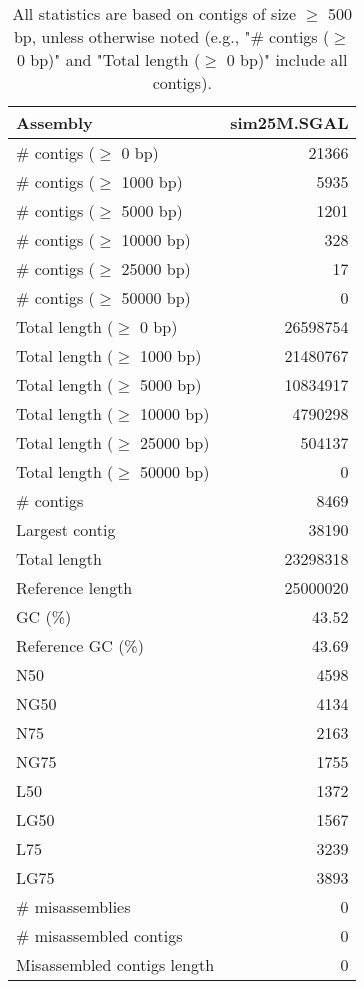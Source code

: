 \documentclass[12pt,a4paper]{article}
\begin{document}
\begin{table}[ht]
\begin{center}
\caption{All statistics are based on contigs of size $\geq$ 500 bp, unless otherwise noted (e.g., "\# contigs ($\geq$ 0 bp)" and "Total length ($\geq$ 0 bp)" include all contigs).}
\begin{tabular}{|l*{1}{|r}|}
\hline
Assembly & sim25M.SGAL \\ \hline
\# contigs ($\geq$ 0 bp) & 21366 \\ \hline
\# contigs ($\geq$ 1000 bp) & 5935 \\ \hline
\# contigs ($\geq$ 5000 bp) & 1201 \\ \hline
\# contigs ($\geq$ 10000 bp) & 328 \\ \hline
\# contigs ($\geq$ 25000 bp) & 17 \\ \hline
\# contigs ($\geq$ 50000 bp) & 0 \\ \hline
Total length ($\geq$ 0 bp) & 26598754 \\ \hline
Total length ($\geq$ 1000 bp) & 21480767 \\ \hline
Total length ($\geq$ 5000 bp) & 10834917 \\ \hline
Total length ($\geq$ 10000 bp) & 4790298 \\ \hline
Total length ($\geq$ 25000 bp) & 504137 \\ \hline
Total length ($\geq$ 50000 bp) & 0 \\ \hline
\# contigs & 8469 \\ \hline
Largest contig & 38190 \\ \hline
Total length & 23298318 \\ \hline
Reference length & 25000020 \\ \hline
GC (\%) & 43.52 \\ \hline
Reference GC (\%) & 43.69 \\ \hline
N50 & 4598 \\ \hline
NG50 & 4134 \\ \hline
N75 & 2163 \\ \hline
NG75 & 1755 \\ \hline
L50 & 1372 \\ \hline
LG50 & 1567 \\ \hline
L75 & 3239 \\ \hline
LG75 & 3893 \\ \hline
\# misassemblies & 0 \\ \hline
\# misassembled contigs & 0 \\ \hline
Misassembled contigs length & 0 \\ \hline

\end{tabular}
\end{center}
\end{table}
\end{document}
